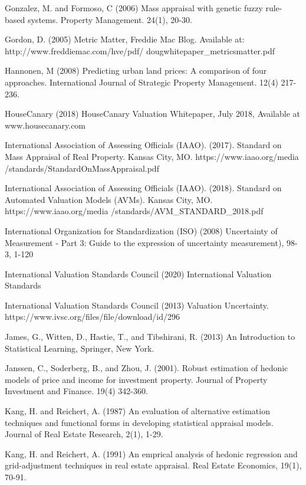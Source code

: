\documentclass[colTwo]{anon}
\theoremstyle{definition}
\begin{document}
\begin{thebibliography}{50}
\harvarditem{}{}{}Gonzalez, M. and Formoso, C (2006) Mass appraisal with genetic fuzzy rule-based systems. Property Management. 24(1), 20-30. 

\harvarditem{}{}{}Gordon, D. (2005) Metric Matter, Freddie Mac Blog. Available at: http://www.freddiemac.com/hve/pdf/ dougwhitepaper\_metricsmatter.pdf

\harvarditem{}{}{}Hannonen, M (2008) Predicting urban land prices: A comparison of four approaches. International Journal of Strategic Property Management. 12(4) 217-236. 

\harvarditem{}{}{}HouseCanary (2018) HouseCanary Valuation Whitepaper, July 2018, Available at www.housecanary.com

\harvarditem{}{}{}International Association of Assessing Officials (IAAO). (2017). Standard on Mass Appraisal of Real Property. Kansas City, MO. https://www.iaao.org/media /standards/StandardOnMassAppraisal.pdf

\harvarditem{}{}{}International Association of Assessing Officials (IAAO). (2018). Standard on Automated Valuation Models (AVMs). Kansas City, MO. https://www.iaao.org/media /standards/AVM\_STANDARD\_2018.pdf

\harvarditem{}{}{} International Organization for Standardization (ISO) (2008) Uncertainty of Measurement - Part 3: Guide to the expression of uncertainty measurement), 98-3, 1-120

\harvarditem{}{}{}International Valuation Standards Council (2020) International Valuation Standards 

\harvarditem{}{}{}International Valuation Standards Council (2013) Valuation Uncertainty. https://www.ivsc.org/files/file/download/id/296

\harvarditem{}{}{}James, G., Witten, D., Hastie, T., and Tibshirani, R.  (2013) An Introduction to Statistical Learning, Springer, New York.

\harvarditem{}{}{}Janssen, C., Soderberg, B., and Zhou, J. (2001). Robust estimation of hedonic models of price and income for investment property. Journal of Property Investment and Finance. 19(4) 342-360. 

\harvarditem{}{}{}Kang, H. and Reichert, A. (1987) An evaluation of alternative estimation techniques and functional forms in developing statistical appraisal models. Journal of Real Estate Research, 2(1), 1-29. 

\harvarditem{}{}{}Kang, H. and Reichert, A. (1991) An emprical analysis of hedonic regression and grid-adjustment techniques in real estate appraisal. Real Estate Economics, 19(1), 70-91. 


\end{thebibliography}
\end{document}
